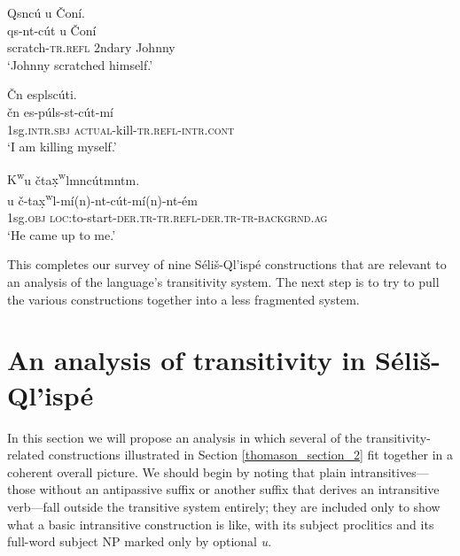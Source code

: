 \documentclass[output=paper,colorlinks,citecolor=brown]{langscibook}
\begin{document}
\ea 
\label{ex-thomason-42}
Qsnc\'u {\textltilde}u \v{C}on\'i. \\
\gll qs-nt-c\'ut {\textltilde}u \v{C}on\'i \\ 
scratch-\textsc{tr.refl} 2ndary Johnny \\
\glt `Johnny scratched himself.'
\z

\ea 
\label{ex-thomason-43}
\v{C}n esplsc\'uti. \\
\gll \v{c}n es-p\'uls-st-c\'ut-m\'i \\
1sg.\textsc{intr.sbj} \textsc{actual}-kill-\textsc{tr.refl-intr.cont} \\
\glt  `I am killing myself.'
\z

\ea 
\label{ex-thomason-44}
{K\textsuperscript w}u \v{c}ta{\d{x}\textsuperscript w}lmnc\'utmntm. \\
u \v{c}-ta{\d{x}\textsuperscript
 w}l-m\'i(n)-nt-c\'ut-m\'i(n)-nt-\'em \\ 
1sg.\textsc{obj} \textsc{loc}:to-start-\textsc{der.tr-tr.refl-der.tr-tr-backgrnd.ag} \\
\glt `He came up to me.'
\z


This completes our survey of nine S\'eli\v{s}-Ql'isp\'e constructions
that are relevant to an analysis of the language's transitivity
system.  The next step is to try to pull the various constructions
together into a less fragmented system.

\section{An analysis of transitivity in S\'eli\v{s}-Ql'isp\'e}  %
\label{thomason_section_3}

In this section we will propose an analysis in which several of the
transitivity-related constructions illustrated in
Section \ref{thomason_section_2} fit
together in a coherent overall picture.  We should begin by noting
that plain intransitives---those without an antipassive suffix or
another suffix that derives an intransitive verb---fall outside the
transitive system entirely; they are included only to show what a
basic intransitive construction is like, with its subject proclitics
and its full-word subject NP marked only by optional \emph{{\textltilde}u}.
\end{document}
